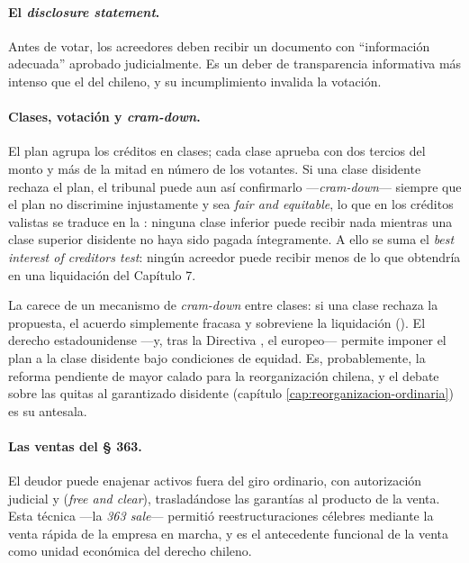 \paragraph{El \emph{disclosure statement}.} Antes de votar, los acreedores deben recibir un
documento con \enquote{información adecuada} aprobado judicialmente. Es un deber de transparencia
informativa más intenso que el del  chileno, y su incumplimiento invalida la votación.

\paragraph{Clases, votación y \emph{cram-down}.} El plan agrupa los créditos en clases; cada clase
aprueba con dos tercios del monto y más de la mitad en número de los votantes. Si una clase
disidente rechaza el plan, el tribunal puede aun así confirmarlo ---\emph{cram-down}--- siempre que
el plan no discrimine injustamente y sea \emph{fair and equitable}, lo que en los créditos valistas
se traduce en la : ninguna clase inferior puede recibir
nada mientras una clase superior disidente no haya sido pagada íntegramente. A ello se suma el
\emph{best interest of creditors test}: ningún acreedor puede recibir menos de lo que obtendría en
una liquidación del Capítulo 7.

\begin{alerta}
La \LIR{} carece de un mecanismo de \emph{cram-down} entre clases: si una clase rechaza la
propuesta, el acuerdo simplemente fracasa y sobreviene la liquidación (). El derecho
estadounidense ---y, tras la Directiva \parencite{ue-directiva-2019-1023}, el europeo--- permite
imponer el plan a la clase disidente bajo condiciones de equidad. Es, probablemente, la reforma
pendiente de mayor calado para la reorganización chilena, y el debate sobre las quitas al
garantizado disidente (capítulo \ref{cap:reorganizacion-ordinaria}) es su antesala.
\end{alerta}

\paragraph{Las ventas del § 363.} El deudor puede enajenar activos fuera del giro ordinario, con
autorización judicial y  (\emph{free and clear}), trasladándose las
garantías al producto de la venta. Esta técnica ---la \emph{363 sale}--- permitió reestructuraciones
célebres mediante la venta rápida de la empresa en marcha, y es el antecedente funcional de la
venta como unidad económica del derecho chileno.

